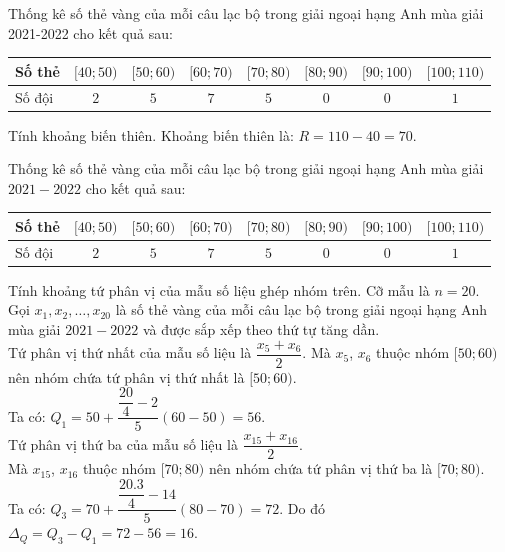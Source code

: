 \begin{ex}%
	Thống kê số thẻ vàng của mỗi câu lạc bộ trong giải ngoại hạng Anh mùa giải 2021-2022 cho kết quả sau:
	\begin{center}
		\begin{tabular}{|l|c|c|c|c|c|c|c|}
			\hline 
			Số thẻ & $[40 ; 50)$ & $[50 ; 60)$ & $[60 ; 70)$ & $[70 ; 80)$ & $[80 ; 90)$ & $[90 ; 100)$ & $[100 ; 110)$ \\
			\hline 
			Số đội & $2$ & $5$ & $7$ & $5$ & $0$ & $0$ & $1$ \\
			\hline
		\end{tabular}
	\end{center}
	Tính khoảng biến thiên.
	\loigiai
	{
		Khoảng biến thiên là: $R=110-40=70$.
	}
\end{ex}

\begin{ex}%
	Thống kê số thẻ vàng của mỗi câu lạc bộ trong giải ngoại hạng Anh mùa giải $2021-2022$ cho kết quả sau:
	\begin{center}
		\begin{tabular}{|l|c|c|c|c|c|c|c|}
			\hline 
			Số thẻ & $[40 ; 50)$ & $[50 ; 60)$ & $[60 ; 70)$ & $[70 ; 80)$ & $[80 ; 90)$ & $[90 ; 100)$ & $[100 ; 110)$ \\
			\hline 
			Số đội & $2$ & $5$ & $7$ & $5$ & $0$ & $0$ & $1$ \\
			\hline
		\end{tabular}
	\end{center}
	Tính khoảng tứ phân vị của mẫu số liệu ghép nhóm trên.
	\loigiai
	{
		Cỡ mẫu là $n=20$.\\
		Gọi $x_1, x_2, \ldots, x_{20}$ là số thẻ vàng của mỗi câu lạc bộ trong giải ngoại hạng Anh mùa giải $2021-2022$ và được sắp xếp theo thứ tự tăng dần.\\
		Tứ phân vị thứ nhất của mẫu số liệu là $\dfrac{x_5+x_6}{2}$.
		Mà $x_5$, $x_6$ thuộc nhóm $[50;60)$ nên nhóm chứa tứ phân vị thứ nhất là $[50;60)$.\\
		Ta có: $Q_1=50+\dfrac{\dfrac{20}{4}-2}{5}(60-50)=56$.\\
		Tứ phân vị thứ ba của mẫu số liệu là $\dfrac{x_{15}+x_{16}}{2}$.\\
		Mà $x_{15}$, $x_{16}$ thuộc nhóm $[70;80)$ nên nhóm chứa tứ phân vị thứ ba là $[70;80)$.\\
		Ta có: $Q_3=70+\dfrac{\dfrac{20.3}{4}-14}{5}(80-70)=72$.
		Do đó $\Delta_Q=Q_3-Q_1=72-56=16$.
	}
\end{ex}

